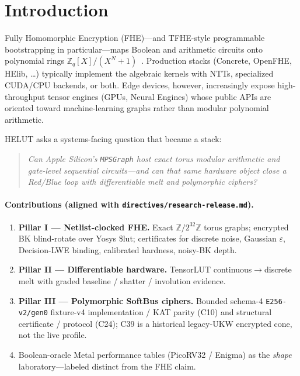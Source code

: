 \documentclass[11pt,a4paper]{article}
\begin{document}
\section{Introduction}

Fully Homomorphic Encryption (FHE)---and TFHE-style programmable bootstrapping in
particular---maps Boolean and arithmetic circuits onto polynomial rings
$\mathbb{Z}_q[X]/(X^N+1)$~\cite{chillotti2020tfhe,ducas2015fhew}.
Production stacks (Concrete, OpenFHE, HElib, \ldots) typically implement the
algebraic kernels with NTTs, specialized CUDA/CPU backends, or both.
Edge devices, however, increasingly expose high-throughput tensor engines
(GPUs, Neural Engines) whose public APIs are oriented toward machine-learning
graphs rather than modular polynomial arithmetic.

HELUT asks a systems-facing question that became a stack:

\begin{quote}
\emph{Can Apple Silicon's \texttt{MPSGraph} host exact torus modular arithmetic
and gate-level sequential circuits---and can that same hardware object close a
Red/Blue loop with differentiable melt and polymorphic ciphers?}
\end{quote}

\paragraph{Contributions (aligned with \texttt{directives/research-release.md}).}
\begin{enumerate}[leftmargin=*]
  \item \textbf{Pillar I --- Netlist-clocked FHE.}
        Exact $\mathbb{Z}/2^{32}\mathbb{Z}$ torus graphs; encrypted BK blind-rotate
        over Yosys \$lut; certificates for discrete noise, Gaussian $\varepsilon$,
        Decision-LWE binding, calibrated hardness, noisy-BK depth.
  \item \textbf{Pillar II --- Differentiable hardware.}
        TensorLUT continuous$\to$discrete melt with graded baseline / shatter /
        involution evidence.
  \item \textbf{Pillar III --- Polymorphic SoftBus ciphers.}
        Bounded schema-4 \texttt{E256-v2/gen0} fixture-v4 implementation /
        KAT parity (C10) and structural certificate / protocol (C24); C39 is a
        historical legacy-UKW encrypted cone, not the live profile.
  \item Boolean-oracle Metal performance tables (PicoRV32 / Enigma) as the
        \emph{shape} laboratory---labeled distinct from the FHE claim.
\end{enumerate}
\end{document}
